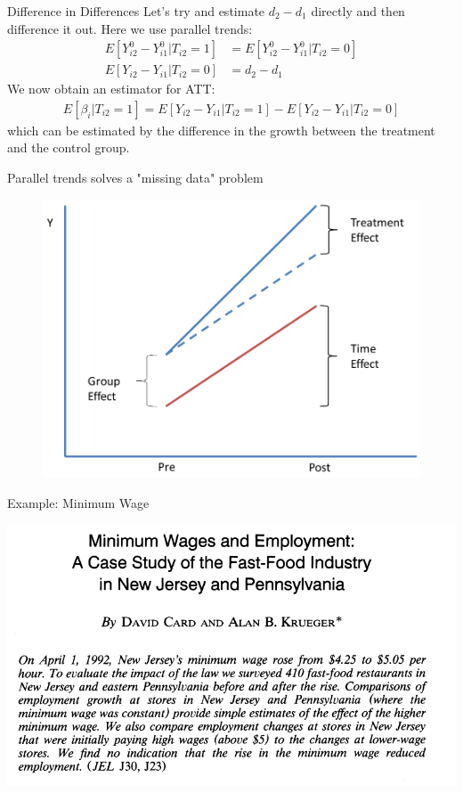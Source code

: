 \begin{frame}{Difference in Differences} 
Let's try and estimate $d_2- d_1$ directly and then difference it out. Here we use \alert{parallel trends}:
\begin{align*}
E[Y_{i2}^0 - Y_{i1}^0 | T_{i2}=1]  &= E[Y_{i2}^0 - Y_{i1}^0 | T_{i2}=0] \\
E[Y_{i2} - Y_{i1} | T_{i2}=0] & = d_2-d_1
\end{align*}
We now obtain an estimator for ATT:
\begin{align*}
E[\beta_{i}| T_{i2}=1]  = E[Y_{i2} - Y_{i1} | T_{i2}=1] - E[Y_{i2} - Y_{i1} | T_{i2}=0]  
\end{align*}
which can be estimated by the difference in the growth between the treatment and the control group.
\end{frame}

\begin{frame}{Parallel trends solves a "missing data" problem}
\begin{figure}
\centering
\includegraphics[width=.9\textwidth]{./resources/myDiD}
\end{figure}
\end{frame}

\begin{frame}{Example: Minimum Wage}

\includegraphics[width=\textwidth]{./resources/CKAbstract}
\end{frame}


